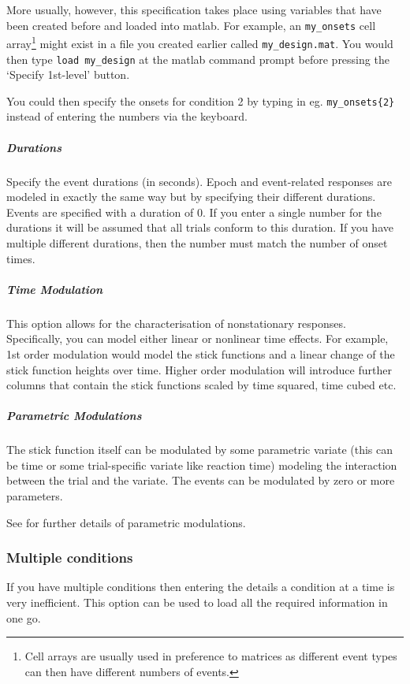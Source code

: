 More usually, however, this specification takes place using variables that have been created before and loaded into matlab. For example, an \verb!my_onsets! cell array\footnote{Cell arrays are usually used in preference to matrices as different event types can then have different numbers of events.} might exist in a file you created earlier called \verb!my_design.mat!. You would then type \verb!load my_design! at the matlab command prompt before pressing the `Specify 1st-level' button. 

You could then specify the onsets for condition 2 by typing in eg. \verb!my_onsets{2}! instead of entering the numbers via the keyboard.


\subparagraph{Durations}

Specify the event durations (in seconds). Epoch and event-related responses are modeled in exactly the same way but by specifying their different durations.  Events are specified with a duration of 0.  If you enter a single number for the durations it will be assumed that all trials conform to this duration. If you have multiple different durations, then the number must match the number of onset times.

\subparagraph{Time Modulation}

This option allows for the characterisation of nonstationary responses.  Specifically, you can model either linear or nonlinear time effects. For example, 1st order modulation would model the stick functions and a linear change of the stick function heights over time. Higher order modulation will introduce further columns that contain the stick functions scaled by time squared, time cubed etc.

\subparagraph{Parametric Modulations}

The stick function itself can be modulated by some parametric variate (this can be time or some trial-specific variate like reaction time) modeling the interaction between the trial and the variate. The events can be modulated by zero or more parameters.

See \cite{parametric_pet,parametric_fmri} for further details of parametric modulations.

\subsubsection{Multiple conditions}

If you have multiple conditions then entering the details a condition at a time is very inefficient. This option can be used to load all the required information in one go. 

